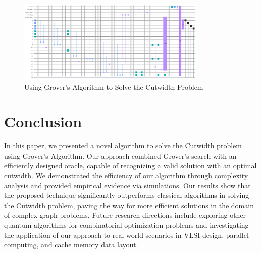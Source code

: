 \begin{figure}[htp]
    \centering
    \includegraphics[width=9cm]{Figures/Cutwidth_circuit.png}
    \caption{Using Grover's Algorithm to Solve the Cutwidth Problem}
    \label{fig:Cutwidth}
\end{figure}

\section{Conclusion}
\label{sec:conclusion}

In this paper, we presented a novel algorithm to solve the Cutwidth problem using Grover's Algorithm. Our approach combined Grover's search with an efficiently designed oracle, capable of recognizing a valid solution with an optimal cutwidth. We demonstrated the efficiency of our algorithm through complexity analysis and provided empirical evidence via simulations. Our results show that the proposed technique significantly outperforms classical algorithms in solving the Cutwidth problem, paving the way for more efficient solutions in the domain of complex graph problems. Future research directions include exploring other quantum algorithms for combinatorial optimization problems and investigating the application of our approach to real-world scenarios in VLSI design, parallel computing, and cache memory data layout.

